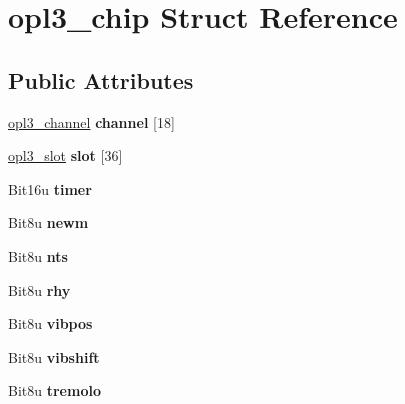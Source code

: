 \hypertarget{structopl3__chip}{\section{opl3\-\_\-chip Struct Reference}
\label{structopl3__chip}
}
\subsection*{Public Attributes}
\begin{DoxyCompactItemize}
\item 
\hypertarget{structopl3__chip_abe94607246756ea383728fa5aca941c2}{\hyperlink{structopl3__channel}{opl3\-\_\-channel} {\bfseries channel} \mbox{[}18\mbox{]}}\label{structopl3__chip_abe94607246756ea383728fa5aca941c2}

\item 
\hypertarget{structopl3__chip_aa3dbcdd7aa27414899f0fce035c07463}{\hyperlink{structopl3__slot}{opl3\-\_\-slot} {\bfseries slot} \mbox{[}36\mbox{]}}\label{structopl3__chip_aa3dbcdd7aa27414899f0fce035c07463}

\item 
\hypertarget{structopl3__chip_a6997c4268c2aafe264ddc5b0868acd68}{Bit16u {\bfseries timer}}\label{structopl3__chip_a6997c4268c2aafe264ddc5b0868acd68}

\item 
\hypertarget{structopl3__chip_a3acd569b8f55a2d475c2bfca8d1f631e}{Bit8u {\bfseries newm}}\label{structopl3__chip_a3acd569b8f55a2d475c2bfca8d1f631e}

\item 
\hypertarget{structopl3__chip_a2692676b1d7d1ffe84150caf9e8e5582}{Bit8u {\bfseries nts}}\label{structopl3__chip_a2692676b1d7d1ffe84150caf9e8e5582}

\item 
\hypertarget{structopl3__chip_af96fb63e6a316ac768403efb67ec3301}{Bit8u {\bfseries rhy}}\label{structopl3__chip_af96fb63e6a316ac768403efb67ec3301}

\item 
\hypertarget{structopl3__chip_a15aef3cf587fa5bd1e4057d2279b308a}{Bit8u {\bfseries vibpos}}\label{structopl3__chip_a15aef3cf587fa5bd1e4057d2279b308a}

\item 
\hypertarget{structopl3__chip_a7bdd0c37556dbd6142e95df6355566b3}{Bit8u {\bfseries vibshift}}\label{structopl3__chip_a7bdd0c37556dbd6142e95df6355566b3}

\item 
\hypertarget{structopl3__chip_a221e1f9fd142b2c73668d98adf6ee5a2}{Bit8u {\bfseries tremolo}}\label{structopl3__chip_a221e1f9fd142b2c73668d98adf6ee5a2}


\end{DoxyCompactItemize}
